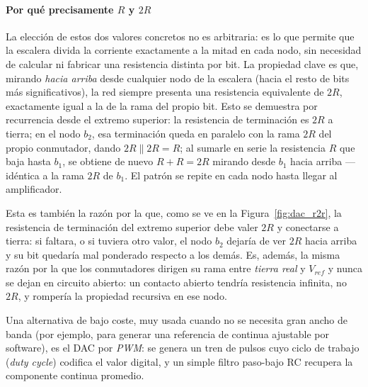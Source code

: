 \paragraph{Por qué precisamente $R$ y $2R$}
La elección de estos dos valores concretos no es arbitraria: es lo que permite que la escalera divida la corriente exactamente a la mitad en cada nodo, sin necesidad de calcular ni fabricar una resistencia distinta por bit. La propiedad clave es que, mirando \emph{hacia arriba} desde cualquier nodo de la escalera (hacia el resto de bits más significativos), la red siempre presenta una resistencia equivalente de $2R$, exactamente igual a la de la rama del propio bit. Esto se demuestra por recurrencia desde el extremo superior: la resistencia de terminación es $2R$ a tierra; en el nodo $b_2$, esa terminación queda en paralelo con la rama $2R$ del propio conmutador, dando $2R \parallel 2R = R$; al sumarle en serie la resistencia $R$ que baja hasta $b_1$, se obtiene de nuevo $R + R = 2R$ mirando desde $b_1$ hacia arriba --- idéntica a la rama $2R$ de $b_1$. El patrón se repite en cada nodo hasta llegar al amplificador.


Esta es también la razón por la que, como se ve en la Figura~\ref{fig:dac_r2r}, la resistencia de terminación del extremo superior debe valer $2R$ y conectarse a tierra: si faltara, o si tuviera otro valor, el nodo $b_2$ dejaría de ver $2R$ hacia arriba y su bit quedaría mal ponderado respecto a los demás. Es, además, la misma razón por la que los conmutadores dirigen su rama entre \emph{tierra real} y $V_{ref}$ y nunca se dejan en circuito abierto: un contacto abierto tendría resistencia infinita, no $2R$, y rompería la propiedad recursiva en ese nodo.

Una alternativa de bajo coste, muy usada cuando no se necesita gran ancho de banda (por ejemplo, para generar una referencia de continua ajustable por software), es el DAC por \emph{PWM}: se genera un tren de pulsos cuyo ciclo de trabajo (\textit{duty cycle}) codifica el valor digital, y un simple filtro paso-bajo RC recupera la componente continua promedio.

